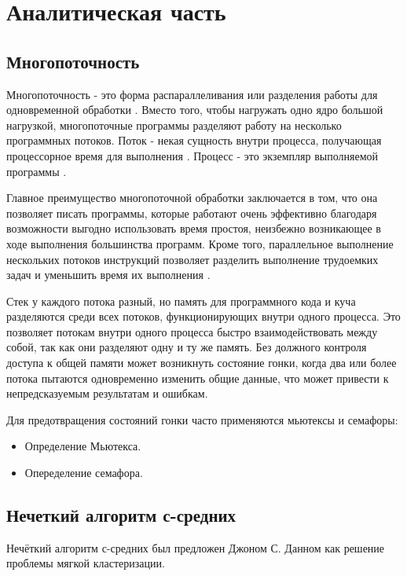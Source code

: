 \chapter{Аналитическая часть}

\section{Многопоточность}

Многопоточность - это форма распараллеливания или разделения работы для одновременной обработки \cite{intel-multithreading}. Вместо того, чтобы нагружать одно ядро большой нагрузкой, многопоточные программы разделяют работу на несколько программных потоков. Поток - некая сущность внутри процесса, получающая процессорное время для выполнения \cite{thread}. Процесс - это экземпляр выполняемой программы \cite{winForProf}.

Главное преимущество многопоточной обработки заключается в том, что она позволяет писать программы, которые работают очень эффективно благодаря возможности выгодно использовать время простоя, неизбежно возникающее в ходе выполнения большинства программ. 
Кроме того, параллельное выполнение нескольких потоков инструкций позволяет разделить выполнение трудоемких задач и уменьшить время их выполнения \cite{mult-in-apps}. 

Стек у каждого потока разный, но память для программного кода и куча разделяются среди всех потоков, функционирующих внутри одного процесса. 
Это позволяет потокам внутри одного процесса быстро взаимодействовать между собой, так как они разделяют одну и ту же память. Без должного контроля доступа к общей памяти может возникнуть состояние гонки, когда два или более потока пытаются одновременно изменить общие данные, что может привести к непредсказуемым результатам и ошибкам.

Для предотвращения состояний гонки часто применяются мьютексы и семафоры:
\begin{itemize}
	\item Определение Мьютекса.
	\item Опеределение семафора. 
\end{itemize}

\section{Нечеткий алгоритм с-средних}

Нечёткий алгоритм с-средних был предложен Джоном С. Данном как решение проблемы мягкой кластеризации.